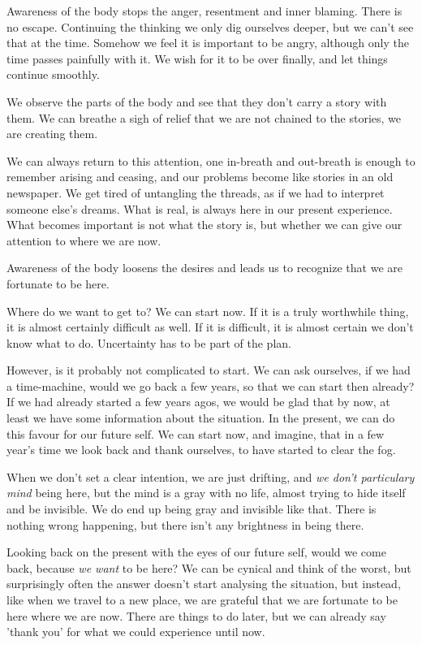 Awareness of the body stops the anger, resentment and inner blaming.
There is no escape. Continuing the thinking we only dig ourselves
deeper, but we can't see that at the time. Somehow we feel it is
important to be angry, although only the time passes painfully with it.
We wish for it to be over finally, and let things continue smoothly.

We observe the parts of the body and see that they don't carry a story
with them. We can breathe a sigh of relief that we are not chained to
the stories, we are creating them.

We can always return to this attention, one in-breath and out-breath is
enough to remember arising and ceasing, and our problems become like
stories in an old newspaper. We get tired of untangling the threads, as
if we had to interpret someone else's dreams. What is real, is always
here in our present experience. What becomes important is not what the
story is, but whether we can give our attention to where we are now.

Awareness of the body loosens the desires and leads us to recognize that
we are fortunate to be here.

Where do we want to get to? We can start now. If it is a truly
worthwhile thing, it is almost certainly difficult as well. If it is
difficult, it is almost certain we don't know what to do. Uncertainty
has to be part of the plan.

However, is it probably not complicated to start. We can ask ourselves,
if we had a time-machine, would we go back a few years, so that we can
start then already? If we had already started a few years agos, we would
be glad that by now, at least we have some information about the
situation. In the present, we can do this favour for our future self. We
can start now, and imagine, that in a few year's time we look back and
thank ourselves, to have started to clear the fog.

When we don't set a clear intention, we are just drifting, and \emph{we
don't particulary mind} being here, but the mind is a gray with no life,
almost trying to hide itself and be invisible. We do end up being gray
and invisible like that. There is nothing wrong happening, but there
isn't any brightness in being there.

Looking back on the present with the eyes of our future self, would we
come back, because \emph{we want} to be here? We can be cynical and
think of the worst, but surprisingly often the answer doesn't start
analysing the situation, but instead, like when we travel to a new
place, we are grateful that we are fortunate to be here where we are
now. There are things to do later, but we can already say 'thank you'
for what we could experience until now.

